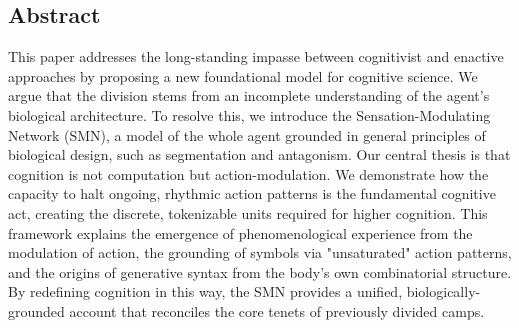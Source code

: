 \subsection*{Abstract}
This paper addresses the long-standing impasse between cognitivist and enactive approaches by proposing a new foundational model for cognitive science. We argue that the division stems from an incomplete understanding of the agent's biological architecture. To resolve this, we introduce the Sensation-Modulating Network (SMN), a model of the whole agent grounded in general principles of biological design, such as segmentation and antagonism. Our central thesis is that cognition is not computation but action-modulation. We demonstrate how the capacity to halt ongoing, rhythmic action patterns is the fundamental cognitive act, creating the discrete, tokenizable units required for higher cognition. This framework explains the emergence of phenomenological experience from the modulation of action, the grounding of symbols via "unsaturated" action patterns, and the origins of generative syntax from the body's own combinatorial structure. By redefining cognition in this way, the SMN provides a unified, biologically-grounded account that reconciles the core tenets of previously divided camps.
